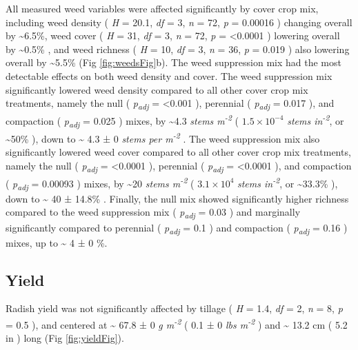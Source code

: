 \documentclass[
  12pt,
]{article}
\begin{document}
All measured weed variables were affected significantly by cover crop mix, including
weed density (
\emph{H} = 20.1,
\emph{df} = 3,
\emph{n} = 72,
\emph{p} = 0.00016
) changing overall by
\textasciitilde6.5\%,
weed cover (
\emph{H} = 31,
\emph{df} = 3,
\emph{n} = 72,
\emph{p} = \textless0.0001
) lowering overall by
\textasciitilde0.5\%
, and
weed richness (
\emph{H} = 10,
\emph{df} = 3,
\emph{n} = 36,
\emph{p} = 0.019
) also lowering overall by
\textasciitilde5.5\%
(Fig \ref{fig:weedsFig}b).
The weed suppression mix had the most detectable effects on both weed density and cover.
The weed suppression mix significantly lowered weed density compared to all other cover crop mix treatments, namely the null (
\emph{p\textsubscript{adj}} = \textless0.001
), perennial (
\emph{p\textsubscript{adj}} = 0.017
), and compaction (
\emph{p\textsubscript{adj}} = 0.025
) mixes, by
\textasciitilde4.3 \emph{stems m\textsuperscript{-2}} (
\ensuremath{1.5\times 10^{-4}} \emph{stems in\textsuperscript{-2}},
or \textasciitilde50\%
), down to
\textasciitilde{} 4.3 ±
0 \emph{stems per m\textsuperscript{-2}}
.
The weed suppression mix also significantly lowered weed cover compared to all other cover crop mix treatments, namely the null (
\emph{p\textsubscript{adj}} = \textless0.0001
), perennial (
\emph{p\textsubscript{adj}} = \textless0.0001
), and compaction (
\emph{p\textsubscript{adj}} = 0.00093
) mixes, by
\textasciitilde20 \emph{stems m\textsuperscript{-2}} (
\ensuremath{3.1\times 10^{4}} \emph{stems in\textsuperscript{-2}},
or \textasciitilde33.3\%
), down to
\textasciitilde{} 40 ±
14.8\%
.
Finally, the null mix showed significantly higher richness compared to the weed suppression mix (
\emph{p\textsubscript{adj}} = 0.03
) and marginally significantly compared to perennial (
\emph{p\textsubscript{adj}} = 0.1
) and compaction (
\emph{p\textsubscript{adj}} = 0.16
) mixes,
up to
\textasciitilde{} 4 ±
0 \%.

\hypertarget{yield}{%
\subsection{Yield}\label{yield}}

Radish yield was not significantly affected by tillage (
\emph{H} = 1.4,
\emph{df} = 2,
\emph{n} = 8,
\emph{p} = 0.5
), and centered at
\textasciitilde{} 67.8 ±
0 \emph{g m\textsuperscript{-2}}
(
0.1 ±
0 \emph{lbs m\textsuperscript{-2}}
) and
\textasciitilde{} 13.2 cm
(
5.2 in
)
long (Fig \ref{fig:yieldFig}).
\end{document}
